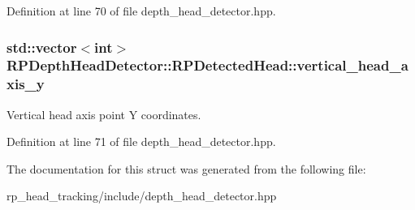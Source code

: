 \-Definition at line 70 of file depth\-\_\-head\-\_\-detector.\-hpp.

\hypertarget{struct_r_p_depth_head_detector_1_1_r_p_detected_head_a0dc5868e140712e5626cf370d0c6fcf7}{
\subsubsection[{vertical\-\_\-head\-\_\-axis\-\_\-y}]{\setlength{\rightskip}{0pt plus 5cm}std\-::vector$<$int$>$ {\bf \-R\-P\-Depth\-Head\-Detector\-::\-R\-P\-Detected\-Head\-::vertical\-\_\-head\-\_\-axis\-\_\-y}}}\label{struct_r_p_depth_head_detector_1_1_r_p_detected_head_a0dc5868e140712e5626cf370d0c6fcf7}
\-Vertical head axis point \-Y coordinates. 

\-Definition at line 71 of file depth\-\_\-head\-\_\-detector.\-hpp.



\-The documentation for this struct was generated from the following file\-:\begin{DoxyCompactItemize}
\item 
rp\-\_\-head\-\_\-tracking/include/depth\-\_\-head\-\_\-detector.\-hpp\end{DoxyCompactItemize}
